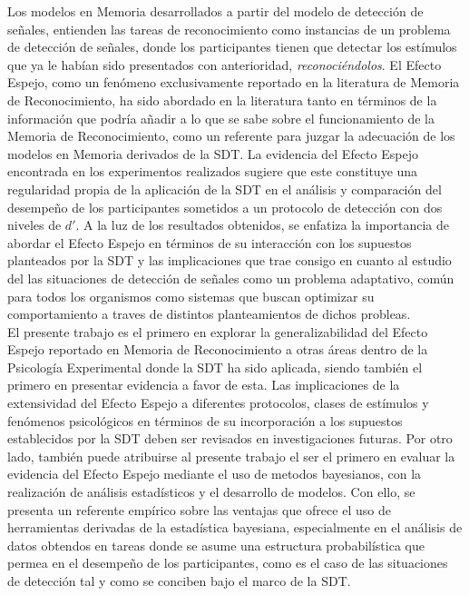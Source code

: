 \documentclass[jou,apacite]{apa6}
\begin{document}
Los modelos en Memoria desarrollados a partir del modelo de detección de señales, entienden las tareas de reconocimiento como instancias de un problema de detección de señales, donde los participantes tienen que detectar los estímulos que ya le habían sido presentados con anterioridad, \textit{reconociéndolos}. El Efecto Espejo, como un fenómeno exclusivamente reportado en la literatura de Memoria de Reconocimiento, ha sido abordado en la literatura tanto en términos de la  información que podría añadir a lo que se sabe sobre el funcionamiento de la Memoria de Reconocimiento, como un referente para juzgar la adecuación de los modelos en Memoria derivados de la SDT. La evidencia del Efecto Espejo encontrada en los experimentos realizados sugiere que este constituye una regularidad propia de la aplicación de la SDT en el análisis y comparación del desempeño de los participantes sometidos a un protocolo de detección con dos niveles de $d'$. A la luz de los resultados obtenidos, se enfatiza la importancia de abordar el Efecto Espejo en términos de su interacción con los supuestos planteados por la SDT y las implicaciones que trae consigo en cuanto al estudio del las situaciones de detección de señales como un problema adaptativo, común para todos los organismos como sistemas que buscan optimizar su comportamiento a traves de distintos planteamientos de dichos probleas.\\

El presente trabajo es el primero en explorar la generalizabilidad del Efecto Espejo reportado en Memoria de Reconocimiento a otras áreas dentro de la Psicología Experimental donde la SDT ha sido aplicada, siendo también el primero en presentar evidencia a favor de esta. Las implicaciones de la extensividad del Efecto Espejo a diferentes protocolos, clases de estímulos y fenómenos psicológicos en términos de su incorporación a los supuestos establecidos por la SDT deben ser revisados en investigaciones futuras. Por otro lado, también puede atribuirse al presente trabajo el ser el primero en evaluar la evidencia del Efecto Espejo mediante el uso de metodos bayesianos, con la realización de análisis estadísticos y el desarrollo de modelos. Con ello, se presenta un referente empírico sobre las ventajas que ofrece el uso de herramientas derivadas de la estadística bayesiana, especialmente en el análisis de datos obtendos en tareas donde se asume una estructura probabilística que permea en el desempeño de los participantes, como es el caso de las situaciones de detección tal y como se conciben bajo el marco de la SDT.\\ 
\end{document}
